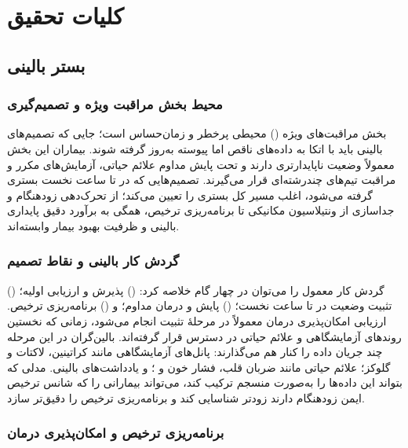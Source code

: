 \chapter{کلیات تحقیق}
\label{ch:introduction}

\section{بستر بالینی}

\subsection{محیط بخش مراقبت ویژه و تصمیم‌گیری}

بخش مراقبت‌های ویژه () محیطی پرخطر و زمان‌حساس است؛ جایی که تصمیم‌های بالینی باید با اتکا به داده‌های ناقص اما پیوسته به‌روز گرفته شوند. بیماران این بخش معمولاً وضعیت ناپایدارتری دارند و تحت پایش مداوم علائم حیاتی، آزمایش‌های مکرر و مراقبت تیم‌های چندرشته‌ای قرار می‌گیرند. تصمیم‌هایی که در  تا  ساعت نخست بستری گرفته می‌شود، اغلب مسیر کل بستری را تعیین می‌کند؛ از تحرک‌دهی زودهنگام و جداسازی از ونتیلاسیون مکانیکی تا برنامه‌ریزی ترخیص، همگی به برآورد دقیق پایداری بالینی و ظرفیت بهبود بیمار وابسته‌اند.

\subsection{گردش کار بالینی و نقاط تصمیم}

گردش کار معمول  را می‌توان در چهار گام خلاصه کرد: () پذیرش و ارزیابی اولیه؛ () تثبیت وضعیت در  تا  ساعت نخست؛ () پایش و درمان مداوم؛ و () برنامه‌ریزی ترخیص. ارزیابی امکان‌پذیری درمان معمولاً در مرحلۀ تثبیت انجام می‌شود، زمانی که نخستین روندهای آزمایشگاهی و علائم حیاتی در دسترس قرار گرفته‌اند. بالین‌گران در این مرحله چند جریان داده را کنار هم می‌گذارند: پانل‌های آزمایشگاهی مانند کراتینین، لاکتات و گلوکز؛ علائم حیاتی مانند ضربان قلب، فشار خون و ؛ و یادداشت‌های بالینی. مدلی که بتواند این داده‌ها را به‌صورت منسجم ترکیب کند، می‌تواند بیمارانی را که شانس ترخیص ایمن زودهنگام دارند زودتر شناسایی کند و برنامه‌ریزی ترخیص را دقیق‌تر سازد.

\subsection{برنامه‌ریزی ترخیص و امکان‌پذیری درمان}

